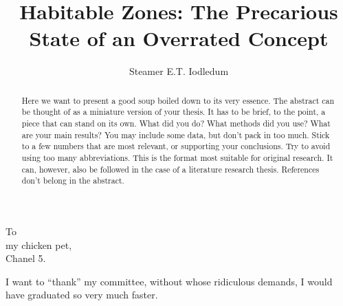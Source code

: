 \documentclass[10pt]{ucscthesisbs}
\begin{document}

\title{Habitable Zones: The Precarious State of an Overrated Concept }
\author{Steamer E.T. Iodledum}
%
%



\maketitle
\copyrightpage

\begin{frontmatter}

\begin{abstract}
Here we want to present a good soup boiled down to its very essence. The abstract can be thought of as a miniature version of your thesis. It has to be brief, to the point, a piece that can stand on its own. What did you do? What methods did you use? What are your main results? You may include some data, but don't pack in too much. Stick to a few numbers that are most relevant, or supporting your conclusions. Try to avoid using too many abbreviations. This is the format most suitable for original research. It can, however, also be followed in the case of a literature research thesis. References don't belong in the abstract.
\end{abstract}

\tableofcontents
%
%
\listoffigures
\listoftables

\begin{dedication}
\null\vfil
{\large
\begin{center}
To \\\vspace{12pt}
my chicken pet,\\\vspace{12pt}
Chanel 5.
\end{center}}
\vfil\null
\end{dedication}

\begin{acknowledgements}
I want to ``thank'' my committee, without whose ridiculous demands, I
would have graduated so very much faster.
\end{acknowledgements}


\end{frontmatter}
\end{document}

